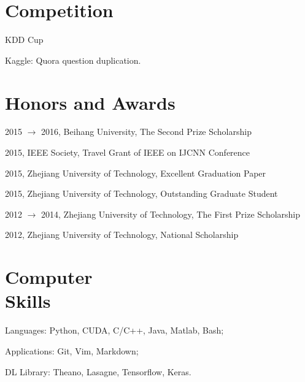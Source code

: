 \documentclass[margin,line]{resume}
\begin{document}
\begin{resume}
\section{Competition}
KDD Cup

Kaggle: Quora question duplication.

\section{Honors and Awards}


2015 $\to$ 2016, Beihang University, The Second Prize Scholarship

2015, IEEE Society, Travel Grant of IEEE on IJCNN Conference

2015, Zhejiang University of Technology, Excellent Graduation Paper

2015, Zhejiang University of Technology, Outstanding Graduate Student

2012 $\to$ 2014, Zhejiang University of Technology, The First Prize Scholarship

2012, Zhejiang University of Technology, National Scholarship




\section{Computer \\ Skills}
Languages:  Python, CUDA, C/C++, Java, Matlab, Bash;

Applications: Git, Vim, Markdown;

DL Library: Theano, Lasagne, Tensorflow, Keras.\\

\end{resume}
\end{document}
